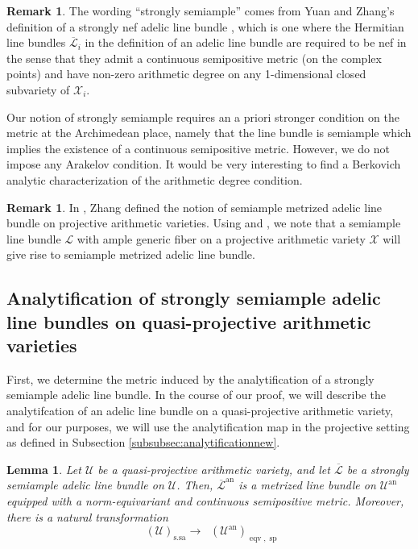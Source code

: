 \documentclass[11pt,reqno]{amsart}
\newcommand{\cX}{\mathcal{X}}
\newcommand{\cU}{\mathcal{U}}
\newcommand{\cL}{\mathcal{L}}
\theoremstyle{theorem}
\numberwithin{equation}{subsection}
\newtheorem{lemma}[subsubsection]{Lemma}
\numberwithin{equation}{subsection}
\theoremstyle{definition}
\newtheorem{remark}[subsubsection]{Remark}
\theoremstyle{remark}
\numberwithin{equation}{subsubsection} \numberwithin{figure}{section}
\DeclareMathOperator{\an}{an}
\DeclareMathOperator{\acPic}{\widehat{\underline{Pic}}}
\DeclareMathOperator{\semip}{sp}
\DeclareMathOperator{\eqv}{eqv}
\DeclareMathOperator{\ssa}{s.sa}
\begin{document}
\begin{remark}
The wording ``strongly semiample'' comes from Yuan and Zhang's definition of a strongly nef adelic line bundle \cite[Definition 2.6.2]{YuanZhang:AdelicLineBundles}, which is one where the Hermitian line bundles $\overline{\cL}_i$ in the definition of an adelic line bundle are required to be nef in the sense that they admit a continuous semipositive metric (on the complex points) and have non-zero arithmetic degree on any 1-dimensional closed subvariety of $\cX_i$.  


Our notion of strongly semiample requires an a priori stronger condition on the metric at the Archimedean place, namely that the line bundle is semiample which implies the existence of a continuous semipositive metric. However, we do not impose any Arakelov condition.
It would be very interesting to find a Berkovich analytic characterization of the arithmetic degree condition. 
\end{remark}

\begin{remark}\label{remark:semiamplemetrized}
In \cite[Sections 3 \& 4]{Zhang:PositiveArithmeticVarieties}, Zhang defined the notion of semiample metrized adelic line bundle on projective arithmetic varieties. 
Using \cite[Theorem 3.5]{Zhang:PositiveArithmeticVarieties} and \cite[Theorem 0.2]{Moriwaki:SemiampleHermitian}, we note that a semiample line bundle $\cL$ with ample generic fiber on a projective arithmetic variety $\cX$ will give rise to semiample metrized adelic line bundle. 
\end{remark}

\subsection{Analytification of strongly semiample adelic line bundles on quasi-projective arithmetic varieties}
First, we determine the metric induced by the analytification of a strongly semiample adelic line bundle. 
In the course of our proof, we will describe the analytifcation of an adelic line bundle on a quasi-projective arithmetic variety, and for our purposes, we will use the analytification map in the projective setting as defined in Subsection \ref{subsubsec:analytificationnew}. 

\begin{lemma}\label{lemma:analytification_ssa_eqvsemip}
Let $\cU$ be a quasi-projective arithmetic variety, and let $\overline{\cL}$ be a strongly semiample adelic line bundle on $\cU$. 
Then, $\overline{\cL}^{\an}$ is a metrized line bundle on $\cU^{\an}$ equipped with a norm-equivariant and continuous semipositive metric. 
Moreover, there is a natural transformation
\[
\acPic(\cU)_{\ssa} \to \acPic(\cU^{\an})_{\eqv,\semip}
\]
\end{lemma}
\end{document}
